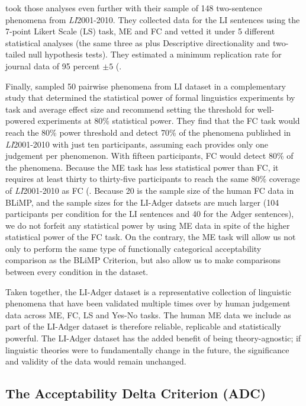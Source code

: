 \citet{sprouse2013comparison} took those analyses even further with their sample of 148 two-sentence phenomena from \textit{LI}2001-2010.  They collected data for the LI sentences using the 7-point Likert Scale (LS) task, ME and FC and vetted it under 5 different statistical analyses (the same three as \citet{sprouse2012assessing} plus Descriptive directionality and two-tailed null hypothesis tests).  They estimated a minimum replication rate for journal data of 95 percent $\pm 5$ (\citealp{sprouse2013comparison,schutze}.  

Finally, \citet{sprouse2017design} sampled 50 pairwise phenomena from LI dataset in a complementary study that determined the statistical power of formal linguistics experiments by task and average effect size and recommend setting the threshold for well-powered experiments at 80\% statistical power.  They find that the FC task would reach the 80\% power threshold and detect 70\% of the phenomena published in \textit{LI}2001-2010 with just ten participants, assuming each provides only one judgement per phenomenon. With fifteen participants, FC would detect 80\% of the phenomena.  Because the ME task has less statistical power than FC, it requires at least thirty to thirty-five participants to reach the same 80\% coverage of \textit{LI}2001-2010 as FC (\citealp{sprouse2017design,schutze}.  Because 20 is the sample size of the human FC data in BLiMP, and the sample sizes for the LI-Adger datsets are much larger (104 participants per condition for the LI sentences and 40 for the Adger sentences), we do not forfeit any statistical power by using ME data in spite of the higher statistical power of the FC task.  On the contrary, the ME task will allow us not only to perform the same type of functionally categorical acceptability comparison as the BLiMP Criterion, but also allow us to make comparisons between every condition in the dataset.

Taken together, the LI-Adger dataset is a representative collection of linguistic phenomena that have been validated multiple times over by human judgement data across ME, FC, LS and Yes-No tasks.  The human ME data we include as part of the LI-Adger dataset is therefore reliable, replicable and statistically powerful.  The LI-Adger dataset has the added benefit of being theory-agnostic; if linguistic theories were to fundamentally change in the future, the significance and validity of the data would remain unchanged.

\subsection{The Acceptability Delta Criterion (ADC)}
\label{section:acceptability_delta_criterion}

